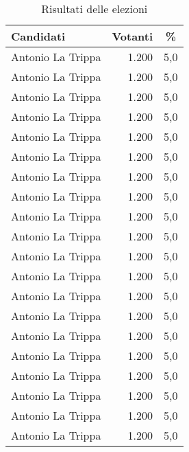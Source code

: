 \documentclass[a4paper,10pt]{article}
\begin{document}
\lipsum[1-4]


\begin{longtable}[htb]{p{} r r}
  \caption{Risultati delle elezioni}\\\hline
	\multicolumn{1}{l}{Candidati}
	&\multicolumn{1}{c}{Votanti}
	&\multicolumn{1}{c}{\%}\\\hline
	Antonio La Trippa	&	1.200 &	5,0 \\
	Antonio La Trippa	&	1.200 &	5,0 \\
	Antonio La Trippa	&	1.200 &	5,0 \\
	Antonio La Trippa	&	1.200 &	5,0 \\
	Antonio La Trippa	&	1.200 &	5,0 \\
	Antonio La Trippa	&	1.200 &	5,0 \\
	Antonio La Trippa	&	1.200 &	5,0 \\
	Antonio La Trippa	&	1.200 &	5,0 \\
	Antonio La Trippa	&	1.200 &	5,0 \\
	Antonio La Trippa	&	1.200 &	5,0 \\
	Antonio La Trippa	&	1.200 &	5,0 \\
	Antonio La Trippa	&	1.200 &	5,0 \\
	Antonio La Trippa	&	1.200 &	5,0 \\
	Antonio La Trippa	&	1.200 &	5,0 \\
	Antonio La Trippa	&	1.200 &	5,0 \\
	Antonio La Trippa	&	1.200 &	5,0 \\
	Antonio La Trippa	&	1.200 &	5,0 \\
	Antonio La Trippa	&	1.200 &	5,0 \\
	Antonio La Trippa	&	1.200 &	5,0 \\
	Antonio La Trippa	&	1.200 &	5,0 \\\hline
\end{longtable}
\end{document}
